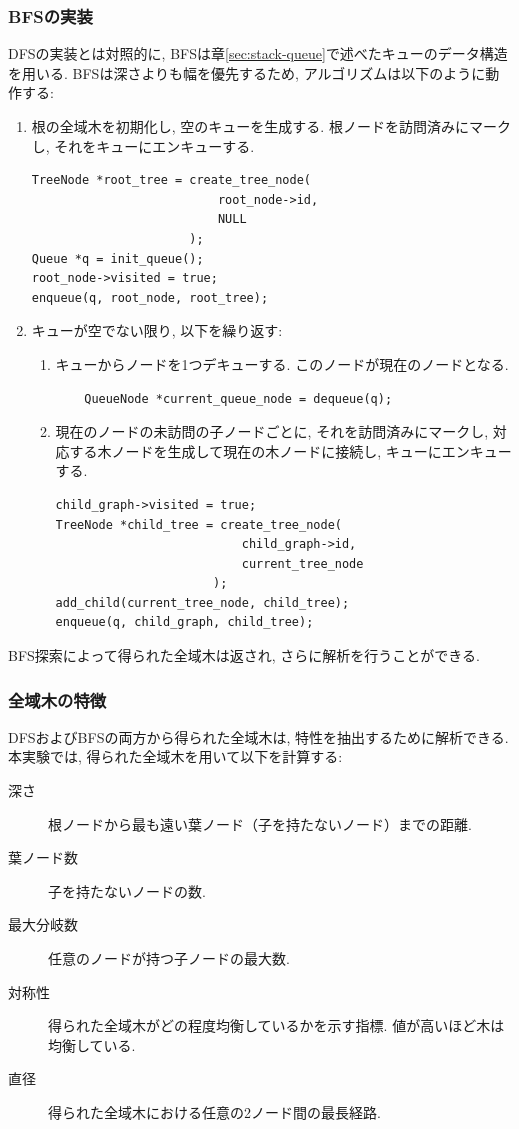 \documentclass[a4j, 12pt]{jarticle}
\begin{document}
\subsubsection{BFSの実装}
DFSの実装とは対照的に, BFSは章\ref{sec:stack-queue}で述べたキューのデータ構造を用いる. BFSは深さよりも幅を優先するため, アルゴリズムは以下のように動作する:
\begin{enumerate}
  \item 根の全域木を初期化し, 空のキューを生成する. 根ノードを訪問済みにマークし, それをキューにエンキューする.
  \begin{lstlisting}[caption=全域木とキューの初期化,label=lst:init-queue-tree]
TreeNode *root_tree = create_tree_node(
                          root_node->id,
                          NULL
                      );
Queue *q = init_queue();
root_node->visited = true;
enqueue(q, root_node, root_tree);
  \end{lstlisting}
  \item キューが空でない限り, 以下を繰り返す:
  \begin{enumerate}
    \item キューからノードを1つデキューする. このノードが現在のノードとなる.
    \begin{lstlisting}
    QueueNode *current_queue_node = dequeue(q);
    \end{lstlisting}
    \item 現在のノードの未訪問の子ノードごとに, それを訪問済みにマークし, 対応する木ノードを生成して現在の木ノードに接続し, キューにエンキューする.
    \begin{lstlisting}[caption=本ノードの各子ノードをキューに入れる,label=lst:dequeue-queue]
child_graph->visited = true;
TreeNode *child_tree = create_tree_node(
                          child_graph->id,
                          current_tree_node
                      );
add_child(current_tree_node, child_tree);
enqueue(q, child_graph, child_tree);
    \end{lstlisting}
  \end{enumerate}
\end{enumerate}
BFS探索によって得られた全域木は返され, さらに解析を行うことができる.
\subsubsection{全域木の特徴}
DFSおよびBFSの両方から得られた全域木は, 特性を抽出するために解析できる. 本実験では, 得られた全域木を用いて以下を計算する\cite{west2001introduction}:

\begin{description}
  \item[深さ] 根ノードから最も遠い葉ノード（子を持たないノード）までの距離.
  \item[葉ノード数] 子を持たないノードの数.
  \item[最大分岐数] 任意のノードが持つ子ノードの最大数.
  \item[対称性] 得られた全域木がどの程度均衡しているかを示す指標. 値が高いほど木は均衡している.
  \item[直径] 得られた全域木における任意の2ノード間の最長経路.
\end{description}
\end{document}
